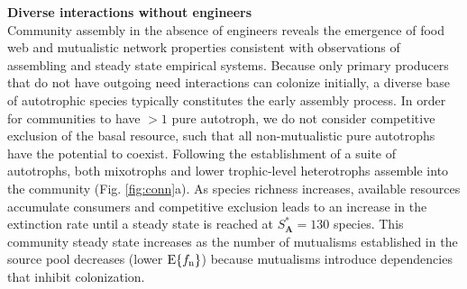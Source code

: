 \documentclass[9pt,twocolumn,twoside]{pnas-new}
\newcommand{\rr}[1]{{\rm #1}}
\begin{document}














\noindent \textbf{Diverse interactions without engineers} \\
\noindent Community assembly in the absence of engineers reveals the emergence of food web and mutualistic network properties consistent with observations of assembling and steady state empirical systems.
Because only primary producers that do not have outgoing need interactions can colonize initially, a diverse base of autotrophic species typically constitutes the early assembly process.
In order for communities to have $>1$ pure autotroph, we do not consider competitive exclusion of the basal resource, such that all non-mutualistic pure autotrophs have the potential to coexist.
Following the establishment of a suite of autotrophs, both mixotrophs and lower trophic-level heterotrophs assemble into the community (Fig. \ref{fig:conn}a).
As species richness increases, available resources accumulate consumers and competitive exclusion leads to an increase in the extinction rate until a steady state is reached at $S^*_{\bm A}=130$ species.
This community steady state increases as the number of mutualisms established in the source pool decreases (lower $\rr{E}\{f_\rr{n}\}$) because mutualisms introduce dependencies that inhibit colonization.
\end{document}

